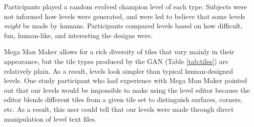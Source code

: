 Participants played a random evolved champion level of each type. Subjects were not informed how levels were generated, and were led to believe that some levels \emph{might} be made by humans. Participants compared levels based on how difficult, fun, human-like, and interesting the designs were.









Mega Man Maker allows for a rich diversity of tiles that vary mainly in their appearance, but the tile types produced by the GAN (Table \ref{tab:tiles}) are relatively plain. As a result, levels look simpler than typical human-designed levels.
One study participant who had experience with Mega Man Maker pointed out that our levels would be impossible to make using the level editor because the editor blends different tiles from a given tile set to distinguish surfaces, corners, etc. As a result, this user could tell that our levels were made through direct manipulation of level text files.




